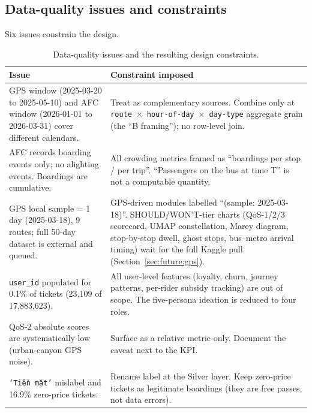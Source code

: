 \subsection{Data-quality issues and constraints}

Six issues constrain the design.

\begin{table}[H]
\centering
\caption{Data-quality issues and the resulting design constraints.}
\label{tab:proposed:dq}
\renewcommand{\arraystretch}{1.25}
\begin{tabularx}{\linewidth}{p{4.4cm}X}
\hline
\textbf{Issue} & \textbf{Constraint imposed} \\
\hline
GPS window (2025-03-20 to 2025-05-10) and AFC window
(2026-01-01 to 2026-03-31) cover different calendars.
& Treat as complementary sources. Combine only at
\texttt{route}~$\times$~\texttt{hour-of-day}~$\times$~\texttt{day-type}
aggregate grain (the ``B framing''); no row-level join. \\

AFC records boarding events only; no alighting events.
Boardings are cumulative.
& All crowding metrics framed as ``boardings per stop / per
trip''. ``Passengers on the bus at time T'' is not a computable
quantity. \\

GPS local sample = 1 day (2025-03-18), 9 routes; full 50-day
dataset is external and queued.
& GPS-driven modules labelled ``(sample: 2025-03-18)''.
SHOULD/WON'T-tier charts (QoS-1/2/3 scorecard, UMAP
constellation, Marey diagram, stop-by-stop dwell, ghost stops,
bus--metro arrival timing) wait for the full Kaggle pull
(Section~\ref{sec:future:gps}). \\

\texttt{user\_id} populated for 0.1\% of tickets (23{,}109 of
17{,}883{,}623).
& All user-level features (loyalty, churn, journey patterns,
per-rider subsidy tracking) are out of scope. The five-persona
ideation is reduced to four roles. \\

QoS-2 absolute scores are systematically low (urban-canyon GPS noise).
& Surface as a relative metric only. Document the caveat next to the KPI. \\

\texttt{`Tiền mặt'} mislabel and 16.9\% zero-price tickets.
& Rename label at the Silver layer. Keep zero-price tickets as legitimate boardings (they are free passes, not data errors). \\
\hline
\end{tabularx}
\end{table}

